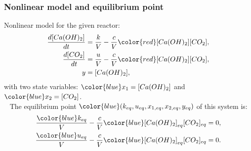 \documentclass{beamer}
\begin{document}
\begin{frame}
\frametitle{Nonlinear model and equilibrium point}
{\color{red}Nonlinear} model for the given reactor:
\pause
\begin{align*}
\frac{d[Ca(OH)_2]}{dt} &= \frac{k}{V} - \frac{c}{V}{\color{red}[Ca(OH)_2][CO_2]}, \\
\frac{d[CO_2]}{dt} &= \frac{u}{V} - \frac{c}{V}{\color{red}[Ca(OH)_2][CO_2]}, \\
y &= [Ca(OH)_2],
\end{align*}
with two state variables: ${\color{blue}x_1=[Ca(OH)_2]}$ and ${\color{blue}x_2=[CO_2]}$.\\
\ \newline
\pause
The equilibrium point ${\color{blue}(k_{eq}, u_{eq}, x_{1,eq}, x_{2,eq}, y_{eq})}$ of this system is:
\pause
\begin{align*}
\frac{{\color{blue}k_{eq}}}{V} - \frac{c}{V}{\color{blue}[Ca(OH)_2]_{eq}[CO_2]_{eq}} = 0, \\
\frac{{\color{blue}u_{eq}}}{V} - \frac{c}{V}{\color{blue}[Ca(OH)_2]_{eq}[CO_2]_{eq}} = 0. \\
\end{align*}
\end{frame}
\end{document}

